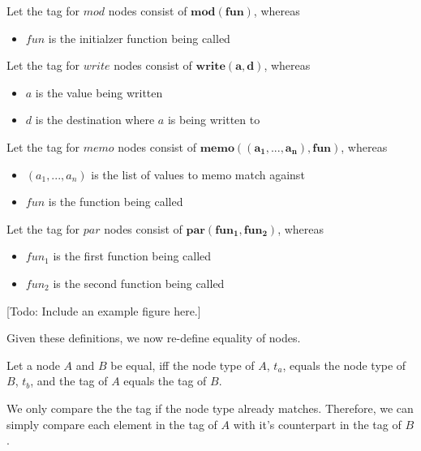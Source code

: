 \begin{definition}
Let the tag for $mod$ nodes consist of $\mathbf{mod(fun)}$, whereas
\begin{itemize}
\item $fun$ is the initialzer function being called
\end{itemize}
\end{definition}

\begin{definition}
Let the tag for $write$ nodes consist of $\mathbf{write(a, d)}$, whereas
\begin{itemize}
\item $a$ is the value being written
\item $d$ is the destination where $a$ is being written to 
\end{itemize}
\end{definition}

\begin{definition}
Let the tag for $memo$ nodes consist of $\mathbf{memo((a_1, ..., a_n), fun)}$, whereas
\begin{itemize}
\item $(a_1, ..., a_n)$ is the list of values to memo match against
\item $fun$ is the function being called
\end{itemize}
\end{definition}

\begin{definition}
Let the tag for $par$ nodes consist of $\mathbf{par(fun_1, fun_2)}$, whereas
\begin{itemize}
\item $fun_1$ is the first function being called
\item $fun_2$ is the second function being called
\end{itemize}
\end{definition}

[Todo: Include an example figure here.]

Given these definitions, we now re-define equality of nodes. 

\begin{definition}
Let a node $A$ and $B$ be equal, iff the node type of $A$, $t_a$, equals the node type of $B$, $t_b$, and the tag of $A$ equals the tag of $B$. 
\end{definition}
We only compare the the tag if the node type already matches. Therefore, we can simply compare each element in the tag of $A$ with it's counterpart in the tag of $B$. 

